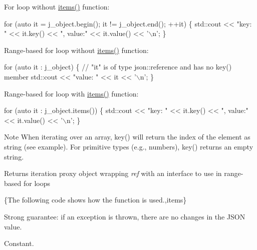For loop without {\ttfamily \hyperlink{classnlohmann_1_1basic__json_afe3e137ace692efa08590d8df40f58dd}{items()}} function\+:


\begin{DoxyCode}
\textcolor{keywordflow}{for} (\textcolor{keyword}{auto} it = j\_object.begin(); it != j\_object.end(); ++it)
\{
    std::cout << \textcolor{stringliteral}{"key: "} << it.key() << \textcolor{stringliteral}{", value:"} << it.value() << \textcolor{charliteral}{'\(\backslash\)n'};
\}
\end{DoxyCode}


Range-\/based for loop without {\ttfamily \hyperlink{classnlohmann_1_1basic__json_afe3e137ace692efa08590d8df40f58dd}{items()}} function\+:


\begin{DoxyCode}
\textcolor{keywordflow}{for} (\textcolor{keyword}{auto} it : j\_object)
\{
    \textcolor{comment}{// "it" is of type json::reference and has no key() member}
    std::cout << \textcolor{stringliteral}{"value: "} << it << \textcolor{charliteral}{'\(\backslash\)n'};
\}
\end{DoxyCode}


Range-\/based for loop with {\ttfamily \hyperlink{classnlohmann_1_1basic__json_afe3e137ace692efa08590d8df40f58dd}{items()}} function\+:


\begin{DoxyCode}
\textcolor{keywordflow}{for} (\textcolor{keyword}{auto} it : j\_object.items())
\{
    std::cout << \textcolor{stringliteral}{"key: "} << it.key() << \textcolor{stringliteral}{", value:"} << it.value() << \textcolor{charliteral}{'\(\backslash\)n'};
\}
\end{DoxyCode}


\begin{DoxyNote}{Note}
When iterating over an array, {\ttfamily key()} will return the index of the element as string (see example). For primitive types (e.\+g., numbers), {\ttfamily key()} returns an empty string.
\end{DoxyNote}
\begin{DoxyReturn}{Returns}
iteration proxy object wrapping {\itshape ref} with an interface to use in range-\/based for loops
\end{DoxyReturn}
\{The following code shows how the function is used.,items\}

Strong guarantee\+: if an exception is thrown, there are no changes in the J\+S\+ON value.

Constant.

